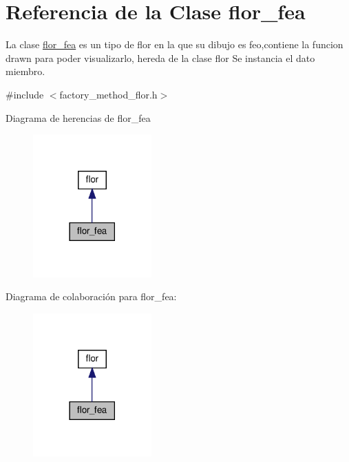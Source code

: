 \hypertarget{classflor__fea}{}\section{Referencia de la Clase flor\+\_\+fea}
\label{classflor__fea}


La clase \hyperlink{classflor__fea}{flor\+\_\+fea} es un tipo de flor en la que su dibujo es feo,contiene la funcion drawn para poder visualizarlo, hereda de la clase flor  Se instancia el dato miembro.  




{\ttfamily \#include $<$factory\+\_\+method\+\_\+flor.\+h$>$}



Diagrama de herencias de flor\+\_\+fea
\nopagebreak
\begin{figure}[H]
\begin{center}
\leavevmode
\includegraphics[width=129pt]{classflor__fea__inherit__graph}
\end{center}
\end{figure}


Diagrama de colaboración para flor\+\_\+fea\+:
\nopagebreak
\begin{figure}[H]
\begin{center}
\leavevmode
\includegraphics[width=129pt]{classflor__fea__coll__graph}
\end{center}
\end{figure}
